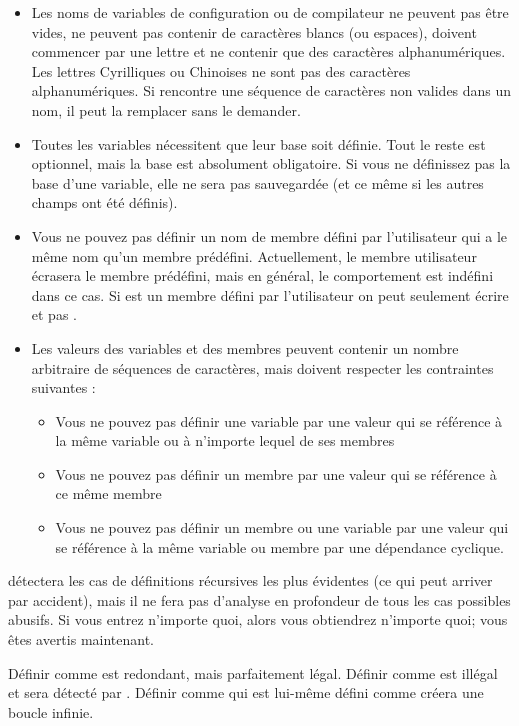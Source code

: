 \begin{itemize}
\item Les noms de variables de configuration ou de compilateur ne peuvent pas être vides, ne peuvent pas contenir de caractères blancs (ou espaces), doivent commencer par une lettre et ne contenir que des caractères alphanumériques. Les lettres Cyrilliques ou Chinoises ne sont pas des caractères alphanumériques. Si \codeblocks rencontre une séquence de caractères non valides dans un nom, il peut la remplacer sans le demander.
\item Toutes les variables nécessitent que leur base soit définie. Tout le reste est optionnel, mais la base est absolument obligatoire. Si vous ne définissez pas la base d'une variable, elle ne sera pas sauvegardée (et ce même si les autres champs ont été définis).
\item Vous ne pouvez pas définir un nom de membre défini par l'utilisateur qui a le même nom qu'un membre prédéfini. Actuellement, le membre utilisateur écrasera le membre prédéfini, mais en général, le comportement est indéfini dans ce cas. Si  est un membre défini par l'utilisateur on peut seulement écrire  et pas .
\item Les valeurs des variables et des membres peuvent contenir un nombre arbitraire de séquences de caractères, mais doivent respecter les contraintes suivantes :
\begin{itemize}
\item Vous ne pouvez pas définir une variable par une valeur qui se référence à la même variable ou à n'importe lequel de ses membres
\item Vous ne pouvez pas définir un membre par une valeur qui se référence à ce même membre
\item Vous ne pouvez pas définir un membre ou une variable par une valeur qui se référence à la même variable ou membre par une dépendance cyclique.
\end{itemize}
\end{itemize}

\codeblocks détectera les cas de définitions récursives les plus évidentes (ce qui peut arriver par accident), mais il ne fera pas d'analyse en profondeur de tous les cas possibles abusifs. Si vous entrez n'importe quoi, alors vous obtiendrez n'importe quoi; vous êtes avertis maintenant.


Définir  comme  est redondant, mais parfaitement légal.
Définir  comme  est illégal et sera détecté par \codeblocks .
Définir  comme  qui est lui-même défini comme  créera une boucle infinie.

